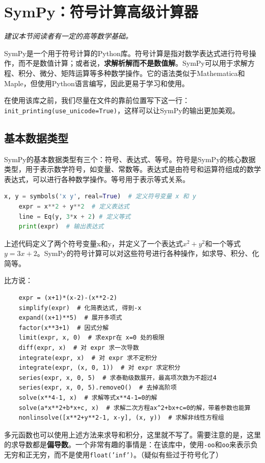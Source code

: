 \documentclass[../main.tex]{subfiles}
\begin{document}
\section{SymPy：符号计算高级计算器}

\begin{flushright}
    \emph{建议本节阅读者有一定的高等数学基础。}
\end{flushright}

SymPy是一个用于符号计算的Python库。符号计算是指对数学表达式进行符号操作，而不是数值计算；或者说，\textbf{求解析解而不是数值解}。SymPy可以用于求解方程、积分、微分、矩阵运算等多种数学操作。它的语法类似于Mathematica和Maple，但使用Python语言编写，因此更易于学习和使用。

在使用该库之前，我们尽量在文件的靠前位置写下这一行：\texttt{init\_printing(use\_unicode=True)}，这样可以让SymPy的输出更加美观。

\subsection{基本数据类型}
SymPy的基本数据类型有三个：符号、表达式、等号。符号是SymPy的核心数据类型，用于表示数学符号，如变量、常数等。表达式是由符号和运算符组成的数学表达式，可以进行各种数学操作。等号用于表示等式关系。
\begin{lstlisting}[language=python]
    x, y = symbols('x y', real=True)  # 定义符号变量 x 和 y
    expr = x**2 + y**2  # 定义表达式
    line = Eq(y, 3*x + 2) # 定义等式
    print(expr)  # 输出表达式
\end{lstlisting}
上述代码定义了两个符号变量x和y，并定义了一个表达式$x^2 + y^2$和一个等式$y = 3x + 2$。SymPy的符号计算可以对这些符号进行各种操作，如求导、积分、化简等。

比方说：
\begin{lstlisting}
    expr = (x+1)*(x-2)-(x**2-2)
    simplify(expr)  # 化简表达式, 得到-x
    expand((x+1)**5)  # 展开多项式
    factor(x**3+1)  # 因式分解
    limit(expr, x, 0)  # 求expr在 x=0 处的极限
    diff(expr, x)  # 对 expr 求一次导数
    integrate(expr, x)  # 对 expr 求不定积分
    integrate(expr, (x, 0, 1))  # 对 expr 求定积分
    series(expr, x, 0, 5)  # 求泰勒级数展开，最高项次数为不超过4
    series(expr, x, 0, 5).removeO()  # 去掉高阶项
    solve(x**4-1, x)  # 求解等式x**4-1=0的解
    solve(a*x**2+b*x+c, x)  # 求解二次方程ax^2+bx+c=0的解，带着参数也能算
    nonlinsolve([x**2+y**2-1, x-y], (x, y))  # 求解非线性方程组
\end{lstlisting}

多元函数也可以使用上述方法来求导和积分，这里就不写了。需要注意的是，这里的求导数都是\textbf{偏导数}。一个非常有趣的事情是：在该库中，使用\texttt{-oo}和\texttt{oo}来表示负无穷和正无穷，而不是使用\texttt{float('inf')}。（疑似有些过于符号化了）
\end{document}

